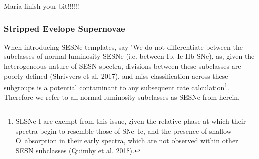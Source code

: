 \documentclass[a4paper,fleqn,usenatbib]{mnras}
\newcommand{\angus}[1]{\color{JungleGreen}#1\color{black}}
\newcommand{\chris}[1]{\color{orange}#1\color{black}}
\newcommand{\maria}[1]{\color{RubineRed}#1\color{black}}
\begin{document}

\maria{Maria finish your bit!!!!!!}

\subsubsection{Stripped Evelope Supernovae}
\angus{When introducing SESNe templates, say "We do not differentiate between the subclasses of normal luminosity SESNe (i.e. between Ib, Ic IIb SNe), as, given the heterogeneous nature of SESN spectra, divisions between these subclasses are poorly defined (Shrivvers et al. 2017), and miss-classification across these subgroups is a potential contaminant to any subsequent rate calculation\footnote{\angus{SLSNe-I are exempt from this issue, given the relative phase at which their spectra begin to resemble those of SNe~Ic, and the presence of shallow O\ion{II}~absorption in their early spectra, which are not observed within other SESN subclasses (Quimby et al. 2018).}}. Therefore we refer to all normal luminosity subclasses as SESNe from herein.}
\end{document}
